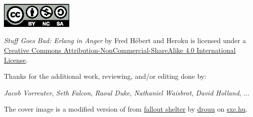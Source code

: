 \documentclass[11pt, oneside]{book}   	%
\begin{document}



\clearpage
\thispagestyle{empty}
\vspace*{\fill}



\begin{center}
\includegraphics[width=100pt]{by-nc-sa.eps}
\end{center}

\begin{center}
\emph{Stuff Goes Bad: Erlang in Anger} by Fred Hébert and Heroku is licensed under a \href{http://creativecommons.org/licenses/by-nc-sa/4.0/}{Creative Commons Attribution-NonCommercial-ShareAlike 4.0 International License}.
\end{center}

Thanks for the additional work, reviewing, and/or editing done by:

\emph{Jacob Vorreuter}, \emph{Seth Falcon}, \emph{Raoul Duke}, \emph{Nathaniel Waisbrot}, \emph{David Holland}, ...

\null
\vfill

The cover image is a modified version of from \href{http://www.freeimages.com/photo/533163}{fallout shelter} by \href{http://www.freeimages.com/profile/drouu}{drouu} on \href{http://sxc.hu}{sxc.hu}.


\clearpage


\tableofcontents

\listoffigures

\hypersetup{linkcolor=violet}
\end{document}
